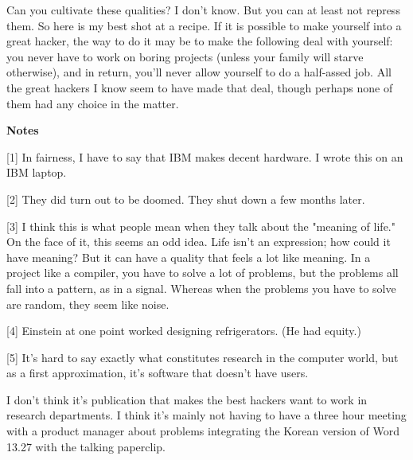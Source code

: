 Can you cultivate these qualities? I
                    don't know. But you can at least not repress them. So here
                    is my best shot at a recipe. If it is possible to make
                    yourself into a great hacker, the way to do it may be to
                    make the following deal with yourself: you never have to
                    work on boring projects (unless your family will starve
                    otherwise), and in return, you'll never allow yourself to do
                    a half-assed job. All the great hackers I know seem to have
                    made that deal, though perhaps none of them had any choice
                    in the matter.





\textbf{Notes}


                    [1] In fairness, I have to say that IBM makes decent
                    hardware. I wrote this on an IBM laptop.

[2] They
                    did turn out to be doomed. They shut down a few months
                    later.

[3] I think this is what people mean when
                    they talk about the "meaning of life." On the face of it,
                    this seems an odd idea. Life isn't an expression; how could
                    it have meaning? But it can have a quality that feels a lot
                    like meaning. In a project like a compiler, you have to
                    solve a lot of problems, but the problems all fall into a
                    pattern, as in a signal. Whereas when the problems you have
                    to solve are random, they seem like noise.
                    

[4]
                    Einstein at one point worked designing refrigerators. (He
                    had equity.)

[5] It's hard to say exactly what
                    constitutes research in the computer world, but as a first
                    approximation, it's software that doesn't have users.

I
                    don't think it's publication that makes the best hackers
                    want to work in research departments. I think it's mainly
                    not having to have a three hour meeting with a product
                    manager about problems integrating the Korean version of
                    Word 13.27 with the talking paperclip.

